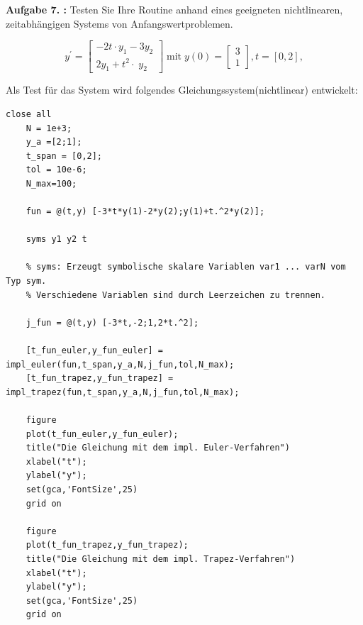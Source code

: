 \begin{figure}[htb]
	
\end{figure}
\begin{figure}[htb]
	
\end{figure}
\clearpage
\begin{mybox}
	\textbf{Aufgabe 7. :} Testen Sie Ihre Routine anhand eines geeigneten nichtlinearen, zeitabhängigen Systems von Anfangswertproblemen.
\end{mybox}

\begin{equation}
y^{\prime } =\left\lbrack \begin{array}{c}
	-2t\cdot y_1 -3y_2 \\
	2y_1 +{t^2 \cdot \;y}_2 
\end{array}\right\rbrack \;\mathrm{mit}\;y\left(0\right)=\left\lbrack \begin{array}{c}
	3\\
	1
\end{array}\right\rbrack ,t=\left\lbrack 0,2\right\rbrack ,
\end{equation}

Als Test für das System wird folgendes Gleichungssystem(nichtlinear) entwickelt:

\begin{lstlisting}[style=Matlab-editor]
	close all
	N = 1e+3;
	y_a =[2;1];
	t_span = [0,2];
	tol = 10e-6;
	N_max=100;
	
	fun = @(t,y) [-3*t*y(1)-2*y(2);y(1)+t.^2*y(2)];
	
	syms y1 y2 t
	
	% syms: Erzeugt symbolische skalare Variablen var1 ... varN vom Typ sym. 
	% Verschiedene Variablen sind durch Leerzeichen zu trennen.
	
	j_fun = @(t,y) [-3*t,-2;1,2*t.^2];
	
	[t_fun_euler,y_fun_euler] = impl_euler(fun,t_span,y_a,N,j_fun,tol,N_max);
	[t_fun_trapez,y_fun_trapez] = impl_trapez(fun,t_span,y_a,N,j_fun,tol,N_max);
	
	figure
	plot(t_fun_euler,y_fun_euler); 
	title("Die Gleichung mit dem impl. Euler-Verfahren")
	xlabel("t");
	ylabel("y");
	set(gca,'FontSize',25)
	grid on
	
	figure
	plot(t_fun_trapez,y_fun_trapez); 
	title("Die Gleichung mit dem impl. Trapez-Verfahren")
	xlabel("t");
	ylabel("y");
	set(gca,'FontSize',25)
	grid on
\end{lstlisting}



